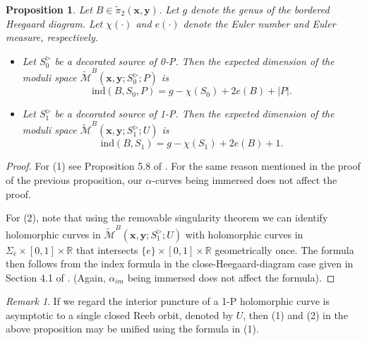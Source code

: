\documentclass{amsart}
\newtheorem{prop}[thm]{Proposition}
\theoremstyle{definition}
\theoremstyle{remark}
\newtheorem{rmk}[thm]{Remark}
\numberwithin{equation}{section}
\numberwithin{equation}{section} \makeatletter
\begin{document}
\begin{prop}\label{Proposition, first index formula}
Let $B\in \widetilde{\pi}_2(\bm{x},\bm{y})$. Let $g$ denote the genus of the bordered Heegaard diagram. Let $\chi(\cdot)$ and $e(\cdot)$ denote the Euler number and Euler measure, respectively.
\begin{itemize}
\item[(1)]Let $S_0^{\triangleright}$ be a decorated source of 0-P. Then the expected dimension of the moduli space $\widetilde{\mathcal{M}}^B(\bm{x},\bm{y};S_0^{\triangleright};P)$ is 
$$\text{ind}(B,S_0,P)=g-\chi(S_0)+2e(B)+|P|.$$
\item[(2)]Let $S_1^{\triangleright}$ be a decorated source of 1-P. Then the expected dimension of the moduli space $\widetilde{\mathcal{M}}^B(\bm{x},\bm{y};S_1^{\triangleright};U)$ is 
$$\text{ind}(B,S_1)=g-\chi(S_1)+2e(B)+1.$$
\end{itemize}
\end{prop}
\begin{proof}
For (1) see Proposition 5.8 of \cite{LOT18}. For the same reason mentioned in the proof of the previous proposition, our $\alpha$-curves being immersed does not affect the proof. 

For (2), note that using the removable singularity theorem we can identify holomorphic curves in $\widetilde{\mathcal{M}}^B(\bm{x},\bm{y};S_1^{\triangleright};U)$ with holomorphic curves in $\Sigma_{\bar{e}}\times [0,1]\times \mathbb{R}$ that intersects $\{e\}\times[0,1]\times \mathbb{R}$ geometrically once. The formula then follows from the index formula in the close-Heegaard-diagram case given in Section 4.1 of \cite{MR2240908}. (Again, $\alpha_{im}$ being immersed does not affect the formula).

\end{proof}
\begin{rmk}
If we regard the interior puncture of a 1-P holomorphic curve is asymptotic to a single closed Reeb orbit, denoted by $U$, then (1) and (2) in the above proposition may be unified using the formula in (1).
\end{rmk}
\end{document}
